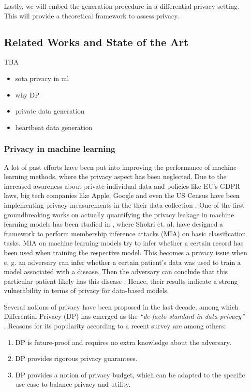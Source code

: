 Lastly, we will embed the generation procedure in a differential privacy setting. This will provide a theoretical framework to assess privacy.

\subsection{Related Works and State of the Art}
TBA
\begin{itemize}
    \item sota privacy in ml 
    \item why DP
    \item private data generation
    \item heartbeat data generation
\end{itemize}
\subsubsection*{Privacy in machine learning}
A lot of past efforts have been put into improving the performance of machine learning methods, where the privacy aspect has been neglected. Due to the increased awareness about private individual data and policies like EU's GDPR laws, big tech companies like Apple, Google and even the US Census have been implementing privacy measurements in the their data collection \parencite[see][]{dwork2019differential,abowd2019census}. One of the first groundbreaking works on actually quantifying the privacy leakage in machine learning models has been studied in \parencite{shokri2017membership}, where Shokri et. al. have designed a framework to perform membership inference attacks (MIA) on basic classification tasks. MIA on machine learning models try to infer whether a certain record has been used when training the respective model. This becomes a privacy issue when e. g. an adversary can infer whether a certain patient's data was used to train a model associated with a disease. Then the adversary can conclude that this particular patient likely has this disease \parencite[cf.][p. 5]{shokri2017membership}. Hence, their results indicate a strong vulnerability in terms of privacy for data-based models.


Several notions of privacy have been proposed in the last decade, among which Differential Privacy (DP) has emerged as the \textit{``de-facto standard in data privacy''} \parencite{kim2021survey}. Reasons for its popularity according to a recent survey \parencite{surv_dp2021} are among others:

\begin{enumerate}
    \item DP is future-proof and requires no extra knowledge about the adversary.
    \item DP provides rigorous privacy guarantees.
    \item DP provides a notion of privacy budget, which can be adapted to the specific use case to balance privacy and utility.
\end{enumerate}

